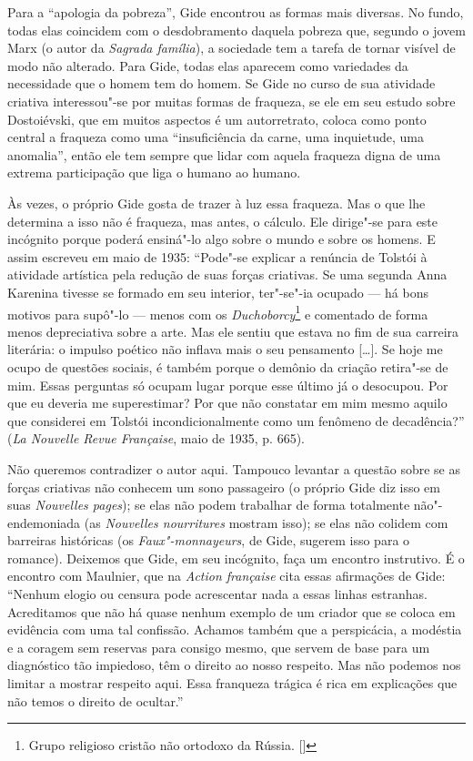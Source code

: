 Para a ``apologia da pobreza'', Gide encontrou as formas mais diversas.
No fundo, todas elas coincidem com o desdobramento daquela pobreza que,
segundo o jovem Marx (o autor da \emph{Sagrada família}), a sociedade
tem a tarefa de tornar visível de modo não alterado. Para Gide, todas elas
aparecem como variedades da necessidade que o homem tem do homem. Se
Gide no curso de sua atividade criativa interessou"-se por muitas formas
de fraqueza, se ele em seu estudo sobre Dostoiévski, que em muitos
aspectos é um autorretrato, coloca como ponto central a fraqueza como
uma ``insuficiência da carne, uma inquietude, uma anomalia'', então ele
tem sempre que lidar com aquela fraqueza digna de uma extrema
participação que liga o humano ao humano.

Às vezes, o próprio Gide gosta de trazer à luz essa fraqueza. Mas o que
lhe determina a isso não é fraqueza, mas antes, o cálculo. Ele dirige"-se para
este incógnito porque poderá ensiná"-lo algo sobre o mundo e sobre os
homens. E assim escreveu em maio de 1935: ``Pode"-se explicar a renúncia
de Tolstói à atividade artística pela redução de suas forças criativas.
Se uma segunda Anna Karenina tivesse se formado em seu interior,
ter"-se"-ia ocupado --- há bons motivos para supô"-lo --- menos com os
\emph{Duchoborcy}\footnote{Grupo religioso cristão não ortodoxo da Rússia. []} e comentado de forma menos depreciativa sobre a arte.
Mas ele sentiu que estava no fim de sua carreira literária: o impulso
poético não inflava mais o seu pensamento [\ldots{}]. Se hoje me ocupo de
questões sociais, é também porque o demônio da criação retira"-se de mim.
Essas perguntas só ocupam lugar porque esse último já o desocupou. Por
que eu deveria me superestimar? Por que não constatar em mim mesmo
aquilo que considerei em Tolstói incondicionalmente como um fenômeno de
decadência?'' (\emph{La Nouvelle Revue Française}, maio de 1935, p.
665).

Não queremos contradizer o autor aqui. Tampouco levantar a questão sobre
se as forças criativas não conhecem um sono passageiro (o próprio Gide
diz isso em suas \emph{Nouvelles pages}); se elas não podem trabalhar de
forma totalmente não"-endemoniada (as \emph{Nouvelles nourritures}
mostram isso); se elas não colidem com barreiras históricas (os
\emph{Faux"-monnayeurs}, de Gide, sugerem isso para o romance). Deixemos
que Gide, em seu incógnito, faça um encontro instrutivo. É o encontro
com Maulnier, que na \emph{Action française} cita essas afirmações de
Gide: ``Nenhum elogio ou censura pode acrescentar nada a essas linhas
estranhas. Acreditamos que não há quase nenhum exemplo de um criador
que se coloca em evidência com uma tal confissão. Achamos também que a
perspicácia, a modéstia e a coragem sem reservas para consigo mesmo, que
servem de base para um diagnóstico tão impiedoso, têm o direito ao nosso
respeito. Mas não podemos nos limitar a mostrar respeito aqui. Essa
franqueza trágica é rica em explicações que não temos o direito de
ocultar.''

